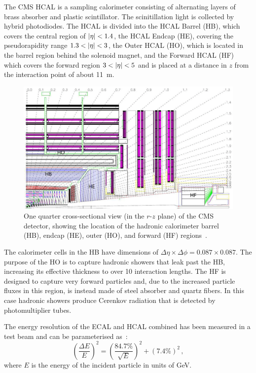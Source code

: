 
The CMS HCAL is a sampling calorimeter consisting of alternating layers of 
brass absorber and plastic scintillator. The scinitillation light is collected 
by hybrid photodiodes. The HCAL is divided into the HCAL Barrel (HB), which 
covers the central region of $|\eta| < 1.4$, the HCAL Endcap (HE), covering 
the pseudorapidity range $1.3 < |\eta| < 3$, the Outer HCAL (HO), which is 
located in the barrel region behind the solenoid magnet, and the 
Forward HCAL (HF) which covers the forward region $3 < |\eta| < 5$ and is 
placed at a distance in $z$ from the interaction point of about 11~m. 

\begin{figure}
	\begin{center}
		\includegraphics[width=0.7\linewidth]{figs/detector/hcal}
	\end{center}
	\caption{One quarter cross-sectional view (in the $r$-$z$ plane) of the CMS 
		detector, showing the location of the hadronic calorimeter barrel (HB), 
		endcap 
		(HE), outer (HO), and forward (HF) regions~\cite{cms}.}
	\label{fig:hcal}
\end{figure}

The calorimeter cells in the HB have dimensions of $\Delta\eta\times\Delta\phi 
= 0.087 \times 0.087$. %
The purpose of the HO is to capture hadronic showers that leak past the HB, 
increasing its effective thickness to over 10 interaction lengths. 
The HF is designed to capture very forward particles and, due to the increased 
particle fluxes in this region, is instead made of steel absorber and quartz 
fibers. In this case hadronic showers produce Cerenkov radiation that is 
detected by photomultiplier tubes. 

The energy resolution of the ECAL and HCAL combined has been measured in a test 
beam and can be parameterised as~\cite{calo-resolution}:
\begin{equation}
\left(\frac{\Delta E}{E}\right)^2 = \left(\frac{84.7\%}{\sqrt{E}}\right)^2 + 
(7.4\%)^2 \, ,
\end{equation}
where $E$ is the energy of the incident particle in units of GeV.

